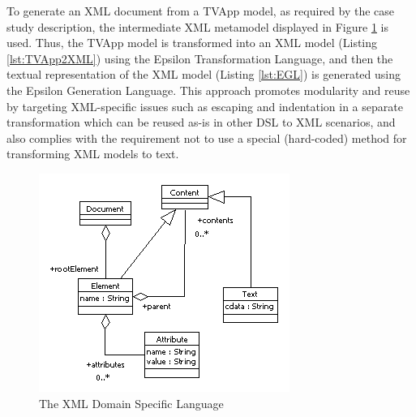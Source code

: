 To generate an XML document from a TVApp model, as required by the case study description, the intermediate XML metamodel displayed in Figure \ref{fig:XML} is used. Thus, the TVApp model is transformed into an XML model (Listing \ref{lst:TVApp2XML}) using the Epsilon Transformation Language, and then the textual representation of the XML model (Listing \ref{lst:EGL}) is generated using the Epsilon Generation Language. This approach promotes modularity and reuse by targeting XML-specific issues such as escaping and indentation in a separate transformation which can be reused as-is in other DSL to XML scenarios, and also complies with the requirement not to use a special (hard-coded) method for transforming XML models to text.

\clearpage

\begin{figure}
	\centering
		\includegraphics{images/XML}
	\caption{The XML Domain Specific Language}
	\label{fig:XML}
\end{figure}

